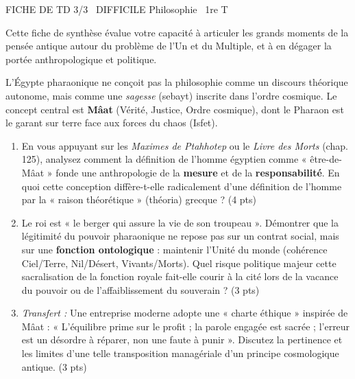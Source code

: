 \documentclass[11pt]{article}
\begin{document}
\begin{tcolorbox}[enhanced,colback=popink,colframe=popink,arc=10pt,boxrule=0pt,left=12pt,right=12pt,top=9pt,bottom=9pt]
{\color{white}\popxbold\small FICHE DE TD 3/3 \textbullet\ DIFFICILE \hfill Philosophie \textbullet\ 1re T\par}
\end{tcolorbox}
\vspace{4pt}
\noindent Cette fiche de synthèse évalue votre capacité à articuler les grands moments de la pensée antique autour du problème de l'Un et du Multiple, et à en dégager la portée anthropologique et politique.

\begin{exercice}
L'Égypte pharaonique ne conçoit pas la philosophie comme un discours théorique autonome, mais comme une \textit{sagesse} (sebayt) inscrite dans l'ordre cosmique. Le concept central est \textbf{Mâat} (Vérité, Justice, Ordre cosmique), dont le Pharaon est le garant sur terre face aux forces du chaos (Isfet).

\begin{enumerate}
    \item En vous appuyant sur les \textit{Maximes de Ptahhotep} ou le \textit{Livre des Morts} (chap. 125), analysez comment la définition de l'homme égyptien comme « être-de-Mâat » fonde une anthropologie de la \textbf{mesure} et de la \textbf{responsabilité}. En quoi cette conception diffère-t-elle radicalement d'une définition de l'homme par la « raison théorétique » (théoria) grecque ? (4 pts)
    \item Le roi est « le berger qui assure la vie de son troupeau ». Démontrer que la légitimité du pouvoir pharaonique ne repose pas sur un contrat social, mais sur une \textbf{fonction ontologique} : maintenir l'Unité du monde (cohérence Ciel/Terre, Nil/Désert, Vivants/Morts). Quel risque politique majeur cette sacralisation de la fonction royale fait-elle courir à la cité lors de la vacance du pouvoir ou de l'affaiblissement du souverain ? (3 pts)
    \item \textit{Transfert :} Une entreprise moderne adopte une « charte éthique » inspirée de Mâat : « L'équilibre prime sur le profit ; la parole engagée est sacrée ; l'erreur est un désordre à réparer, non une faute à punir ». Discutez la pertinence et les limites d'une telle transposition managériale d'un principe cosmologique antique. (3 pts)
\end{enumerate}
\end{exercice}
\end{document}

